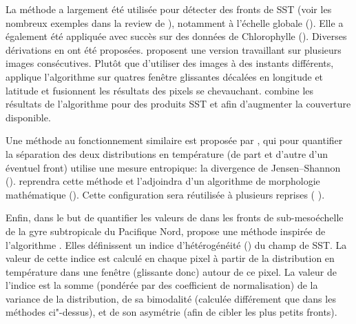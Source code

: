 La méthode  a largement été utilisée pour détecter des fronts de SST (voir les nombreux exemples dans la review de \cite{belkin_2021}), notamment à l'échelle globale (\cite{belkin_2009a, belkin_2007}).
Elle a également été appliquée avec succès sur des données de Chlorophylle (\cite{stegmann_2004, kahru_2012, bontempi_2004}).
Diverses dérivations en ont été proposées.
\textcite{cayula_1995} proposent une version travaillant sur plusieurs images consécutives.
Plutôt que d'utiliser des images à des instants différents, \textcite{nieto_2012} applique l'algorithme  sur quatres fenêtre glissantes décalées en longitude et latitude et fusionnent les résultats des pixels se chevauchant.
\textcite{miller_2009} combine les résultats de l'algorithme  pour des produits SST et  afin d'augmenter la couverture disponible.

Une méthode au fonctionnement similaire est proposée par \textcite{vazquez_1999}, qui pour quantifier la séparation des deux distributions en température (de part et d'autre d'un éventuel front) utilise une mesure entropique: la divergence de Jensen--Shannon (\cite{barranco-lopez_1995}).
\textcite{shimada_2005} reprendra cette méthode et l'adjoindra d'un algorithme de morphologie mathématique (\cite{jiang_1997}).
Cette configuration sera réutilisée à plusieurs reprises (\cite{lan_2012} ).

Enfin, dans le but de quantifier les valeurs de  dans les fronts de sub-mesoéchelle de la gyre subtropicale du Pacifique Nord, \textcite{liu_2016} propose une méthode inspirée de l'algorithme .
Elles définissent un indice d'hétérogénéité () du champ de SST.
La valeur de cette indice est calculé en chaque pixel à partir de la distribution en température dans une fenêtre (glissante donc) autour de ce pixel.
La valeur de l'indice est la somme (pondérée par des coefficient de normalisation) de la variance de la distribution, de sa bimodalité (calculée différement que dans les méthodes ci"-dessus), et de son asymétrie (afin de cibler les plus petits fronts).


